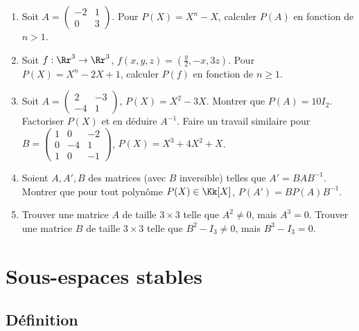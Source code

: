 \documentclass[12pt, class=report,crop=false]{standalone}
\begin{document}
\begin{miniexercices}
\sauteligne
\begin{enumerate}
  \item Soit $A = \left(\begin{smallmatrix}-2&1\\0&3\end{smallmatrix}\right)$.
  Pour $P(X) =  X^n-X$, calculer $P(A)$ en fonction de $n > 1$.
  
  \item Soit $f : \Rr^3 \to \Rr^3$, $f(x,y,z) = (\frac y2, -x, 3z)$.
  Pour $P(X) = X^n - 2X +1$, calculer $P(f)$ en fonction de $n\ge1$.

  \item Soit $A = 
  \left(\begin{smallmatrix}
  2 & -3 \\
  -4 & 1  
  \end{smallmatrix}\right)$, $P(X)=X^2-3X$.
  Montrer que $P(A)=10 I_2$. Factoriser $P(X)$ et en déduire $A^{-1}$. 
  Faire un travail similaire pour $B = 
  \left(\begin{smallmatrix}
  1 & 0 & -2 \\
0 & -4 & 1 \\
1 & 0 & -1\end{smallmatrix}\right)$, $P(X)=X^3+4X^2+X$.
  
  \item Soient $A,A',B$ des matrices (avec $B$ inversible) telles que $A' = B A B^{-1}$.
Montrer que pour tout polynôme $P(X) \in \Kk[X]$, $P(A') = B P(A) B^{-1}$.
  
  \item Trouver une matrice $A$ de taille $3\times 3$ telle que $A^2\neq 0$, mais $A^3 = 0$.
  Trouver une matrice $B$ de taille $3\times 3$ telle que $B^2-I_3\neq 0$, mais $B^3 - I_3 = 0$.
\end{enumerate}
\end{miniexercices}




\section{Sous-espaces stables}


\subsection{Définition}
\end{document}
